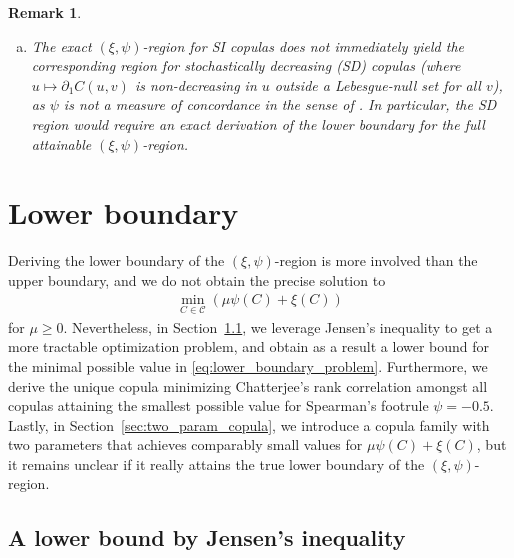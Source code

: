 \documentclass{article}
\newtheorem{remark}[theorem]{Remark}
\newcommand{\1}{\mathds{1}}
\newcommand{\CC}{\mathcal{C}}  %
\begin{document}
\begin{remark}
\begin{enumerate}[(a)]
    \(
        \xi(C^{\Delta}) = \frac12 > \frac13 = \psi(C^{\Delta}),
    \)
    see also \cite[Prop.~3.3]{rockel2025measures}.
    \item The exact $(\xi,\psi)$-region for SI copulas does not immediately yield the corresponding region for stochastically decreasing (SD) copulas (where $u \mapsto \partial_1 C(u,v)$ is non-decreasing in $u$ outside a Lebesgue-null set for all $v$), as $\psi$ is \emph{not} a measure of concordance in the sense of \cite[Def.~2.4.7]{Durante-2016}.
    In particular, the SD region would require an exact derivation of the lower boundary for the full attainable $(\xi,\psi)$-region.
\end{enumerate}
\end{remark}

\section{Lower boundary}
\label{sec:lower_boundary}

Deriving the lower boundary of the $(\xi,\psi)$-region is more involved than the upper boundary, and we do not obtain the precise solution to
\begin{align}\label{eq:lower_boundary_problem}
    \min_{C \in \CC} \left( \mu\psi(C) + \xi(C) \right)
\end{align}
for $\mu\ge 0$.
Nevertheless, in Section~\ref{sec:lower_bound_jensen}, we leverage Jensen's inequality to get a more tractable optimization problem, and obtain as a result a lower bound for the minimal possible value in \eqref{eq:lower_boundary_problem}.
Furthermore, we derive the unique copula minimizing Chatterjee's rank correlation amongst all copulas attaining the smallest possible value for Spearman's footrule $\psi=-0.5$.
Lastly, in Section~\ref{sec:two_param_copula}, we introduce a copula family with two parameters that achieves comparably small values for $\mu\psi(C) + \xi(C)$, but it remains unclear if it really attains the true lower boundary of the $(\xi,\psi)$-region.

\subsection{A lower bound by Jensen's inequality}
\label{sec:lower_bound_jensen}
\end{document}

